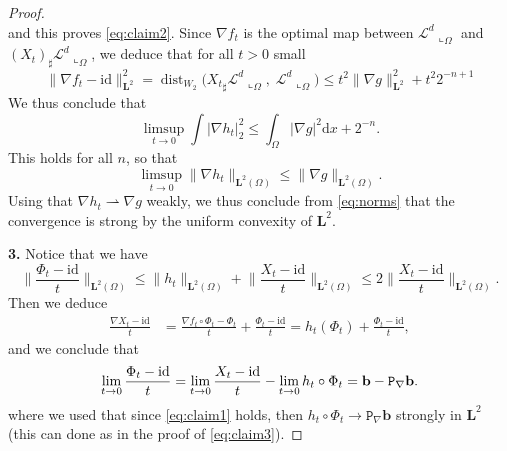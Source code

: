 \documentclass[11pt, twoside, reqno]{amsart}
\newcounter{clai}
\theoremstyle{definition} \newtheorem{definition}{Definition}[section]
\theoremstyle{definition} \newtheorem{remark}[definition]{Remark}
\theoremstyle{plain} \newtheorem{lemma}[definition]{Lemma}
\theoremstyle{plain} \newtheorem{proposition}[definition]{Proposition}
\theoremstyle{plain} \newtheorem{theorem}[definition]{Theorem}
\theoremstyle{plain} \newtheorem{corollary}[definition]{Corollary}
\theoremstyle{definition} \newtheorem{example}[definition]{Example}
\theoremstyle{plain} \newtheorem{claim}[clai]{Claim}
\theoremstyle{definition} \newtheorem{assumption}[definition]{Assumption}
\DeclareMathOperator{\dist}{dist}
\newcommand{\Id}{\mathrm{id}}
\newcommand{\1}{\mathbbm 1}
\renewcommand{\b}{\mathbf b}
\newcommand{\rest}{\llcorner}
\numberwithin{equation}{section} %
\theoremstyle{plain} \newtheorem*{theorem*}{Theorem}
\theoremstyle{plain} \newtheorem{mthm}[maintheorem]{Main Theorem}
\theoremstyle{plain} \newtheorem*{mthm*}{Main Theorem}
\theoremstyle{plain} \newtheorem*{conjecture*}{Conjecture}
\theoremstyle{plain} \newtheorem{conjecture}[definition]{Conjecture}
\theoremstyle{plain} \newtheorem*{problem*}{Problem}
\begin{document}
\begin{proof}
$$$$
and this proves \eqref{eq:claim2}.
Since $\nabla f_t$ is the optimal map between $\mathscr L^d \rest_\Omega$ and $(X_t)_\sharp \mathscr L^d \rest_\Omega$, we deduce that for all $t> 0$ small
\begin{equation}
    \|\nabla f_t -\Id\|_{\mathbf L^2}^2 = \dist_{W_2} \big( {X_t}_\sharp \mathscr L^d \rest_{\Omega}, \; \mathscr L^d \rest_\Omega \big) \leq t^2 \|\nabla g\|_{\mathbf L^2}^2 + t^2 2^{-n+1}
\end{equation}
We thus conclude that
\begin{equation*}
\limsup_{t \to 0} \int |\nabla h_t|_2^2 \leq \int_\Omega |\nabla g|^2 \mathrm{d} x + 2^{-n}.
\end{equation*}
This holds for all $n$, so that
\begin{equation}\label{eq:norms}
\limsup_{t \to 0} \|\nabla h_t\|_{\mathbf L^2(\Omega)} \leq \|\nabla g\|_{\mathbf L^2(\Omega)}.
\end{equation}
Using that $\nabla h_t \rightharpoonup \nabla g$ weakly, we thus conclude from \eqref{eq:norms} that the convergence is strong by the uniform convexity of $\mathbf L^2$.


\vspace{0.5cm}
\textbf{3.} Notice that we have
\begin{equation}\label{eq:claim1}
\bigg\| \frac{\Phi_t - \Id}{t} \bigg\|_{\mathbf L^2(\Omega)} \leq \|h_t\|_{\mathbf L^2(\Omega)} + \bigg\| \frac{X_t - \Id}{t} \bigg\|_{\mathbf L^2(\Omega)} \leq 2 \bigg\| \frac{X_t - \Id}{t} \bigg\|_{\mathbf L^2(\Omega)}.
\end{equation}
Then we deduce
\begin{equation*}
\begin{split}
\frac{\nabla {X_t} - \Id}{t} &= \frac{\nabla {f_t}\circ \Phi_t - \Phi_t}{t} + \frac{\Phi_t - \Id}{t} = h_t(\Phi_t) + \frac{\Phi_t - \Id}{t},
\end{split}
\end{equation*}
and we conclude that
\begin{equation*}
\lim_{t \to 0} \frac{\Phi_t - \Id}{t} = \lim_{t \to 0} \frac{{X_t} - \Id}{t} - \lim_{t \to 0} h_t \circ \Phi_t = \b - \mathtt P_\nabla \b. \qedhere
\end{equation*}
where we used that since \eqref{eq:claim1} holds, then $h_t \circ \Phi_t \to \mathtt P_\nabla \b$ strongly in $\mathbf L^2$ (this can done as in the proof of \eqref{eq:claim3}).
\end{proof}
\end{document}
